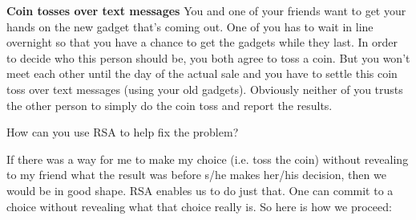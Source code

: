 \question \textbf{Coin tosses over text messages} \newline
You and one of your friends want to get your hands on the new gadget 
that’s coming out. One of you has to wait in line overnight so that 
you have a chance to get the gadgets while they last. In order to 
decide who this person should be, you both agree to toss a coin. But 
you won’t meet each other until the day of the actual sale and you 
have to settle this coin toss over text messages (using your old gadgets). 
Obviously neither of you trusts the other person to simply do the coin 
toss and report the results.\newline
					
How can you use RSA to help fix the problem?	
\begin{solution}
If there was a way for me to make my choice (i.e. toss the coin) 
without revealing to my friend what the result was before s/he makes 
her/his decision, then we would be in good shape.
RSA enables us to do just that. One can commit to a choice without 
revealing what that choice really is. So here is how we proceed: 
\begin{enumerate}


\end{enumerate}
\end{solution}
